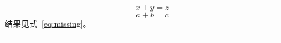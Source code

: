 \documentclass{article}
\begin{document}
\begin{equation}
  x+y=z \label{eq:main}
\end{equation}
\begin{equation}
  a+b=c \label{eq:main}
\end{equation}
结果见式~\eqref{eq:missing}。
\begin{figure}
  \rule{1cm}{1cm}
\end{figure}
\end{document}
